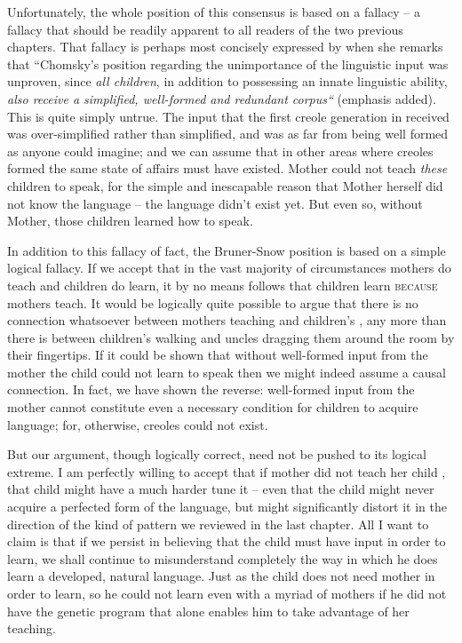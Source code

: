 Unfortunately, the whole position of this consensus is based on a fallacy -- a fallacy that should be readily apparent to all readers of the two previous chapters. That fallacy is perhaps most concisely expressed
by \citet[367]{Snow1979} when she remarks that ``Chomsky's position regarding the unimportance of the linguistic input was unproven, since \textit{all children}, in addition to possessing an innate linguistic ability, \textit{also receive a simplified, well-formed and redundant corpus``} (emphasis added). This is quite simply untrue. The input that the first creole generation in  received was over-simplified rather than simplified, and was as far from being well formed as anyone could imagine; and we can assume that in other areas where creoles formed the same state of affairs must have existed. Mother could not teach \textit{these} children to speak, for the simple and inescapable reason that Mother herself did not know the language -- the language didn't exist yet. But even so, without Mother, those children learned how to speak.

In addition to this fallacy of fact, the Bruner-Snow position is based on a simple logical fallacy. If we accept that in the vast majority of circumstances mothers do teach and children do learn, it by no means follows that children learn \textsc{because} mothers teach. It would be logically quite possible to argue that there is no connection whatsoever between mothers teaching and children's , any more than there is between children's walking and uncles dragging them around the room by their fingertips. If it could be shown that without well-formed input from the mother the child could not learn to speak then we might indeed assume a causal connection. In fact, we have shown the reverse: well-formed input from the mother cannot constitute even a necessary condition for children to acquire language; for, otherwise, creoles could not exist.

But our argument, though logically correct, need not be pushed to its logical extreme. I am perfectly willing to accept that if mother did not teach her child , that child might have a much harder tune  it -- even that the child might never acquire a perfected form of the language, but might significantly distort it in the direction of the kind of pattern we reviewed in the last chapter. All I want to claim is that if we persist in believing that the child must have input in order to learn, we shall continue to misunderstand completely the way in which he does learn a developed, natural language. Just as
the child does not need mother in order to learn, so he could not learn even with a myriad of mothers if he did not have the genetic program that alone enables him to take advantage of her teaching.

